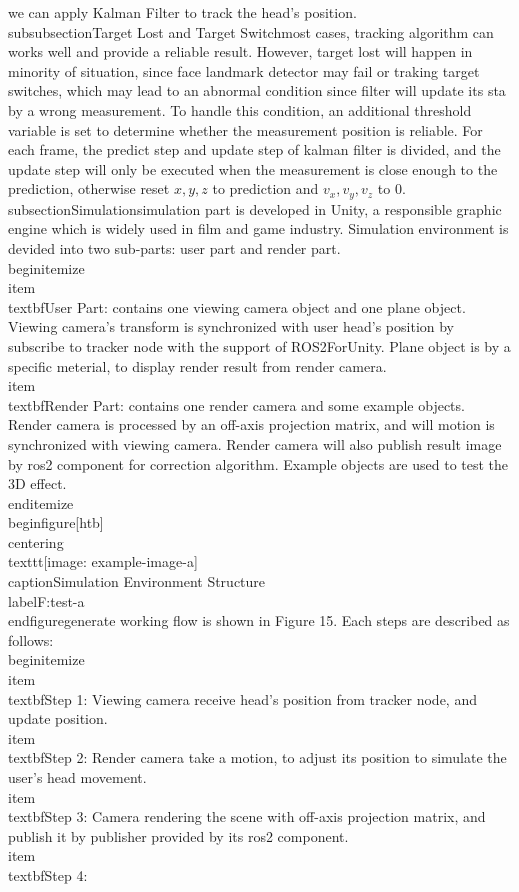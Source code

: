 we can apply Kalman Filter to track the head's position.\n\n\\subsubsection{Target Lost and Target Switch}\nIn most cases, tracking algorithm can works well and provide a reliable result. However, target lost will happen in minority of situation, since face landmark detector may fail or traking target switches, which may lead to an abnormal condition since filter will update its sta by a wrong measurement. To handle this condition, an additional threshold variable is set to determine whether the measurement position is reliable. For each frame, the predict step and update step of kalman filter is divided, and the update step will only be executed when the measurement is close enough to the prediction, otherwise reset $x,y,z$ to prediction and $v_x,v_y,v_z$ to 0.\n\n\n\\subsection{Simulation}\n\nThe simulation part is developed in Unity, a responsible graphic engine which is widely used in film and game industry. Simulation environment is devided into two sub-parts: user part and render part.\n\\begin{itemize}\n    \\item \\textbf{User Part}: contains one viewing camera object and one plane object. Viewing camera's transform is synchronized with user head's position by subscribe to tracker node with the support of ROS2ForUnity. Plane object is by a specific meterial, to display render result from render camera.\n    \\item \\textbf{Render Part}: contains one render camera and some example objects. Render camera is processed by an off-axis projection matrix, and will motion is synchronized with viewing camera. Render camera will also publish result image by ros2 component for correction algorithm. Example objects are used to test the 3D effect.\n\\end{itemize}\n\n\\begin{figure}[htb]\n    \\centering\n    \\texttt{[image: example-image-a]}\n    \\caption{Simulation Environment Structure}\\label{F:test-a}\n\\end{figure}\n\nA generate working flow is shown in Figure 15. Each steps are described as follows:\n\\begin{itemize}\n    \\item \\textbf{Step 1}: Viewing camera receive head's position from tracker node, and update position.\n    \\item \\textbf{Step 2}: Render camera take a motion, to adjust its position to simulate the user's head movement.\n    \\item \\textbf{Step 3}: Camera rendering the scene with off-axis projection matrix, and publish it by publisher provided by its ros2 component.\n    \\item \\textbf{Step 4}: 
